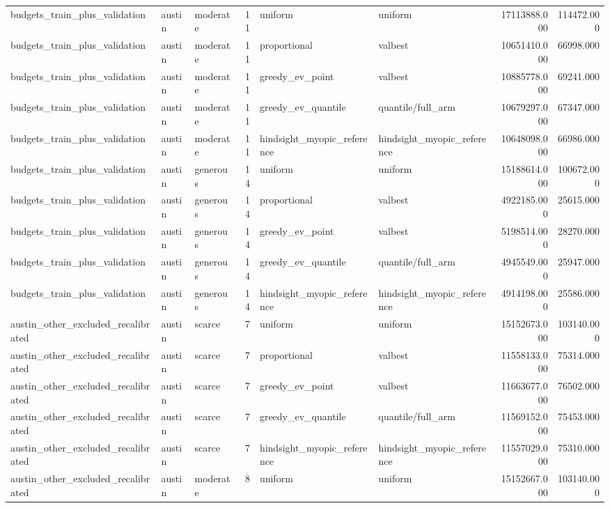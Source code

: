 \begin{tabular}{lllrllrr}
budgets\_train\_plus\_validation & austin & moderate & 11 & uniform & uniform & 17113888.000 & 114472.000 \\
budgets\_train\_plus\_validation & austin & moderate & 11 & proportional & valbest & 10651410.000 & 66998.000 \\
budgets\_train\_plus\_validation & austin & moderate & 11 & greedy\_ev\_point & valbest & 10885778.000 & 69241.000 \\
budgets\_train\_plus\_validation & austin & moderate & 11 & greedy\_ev\_quantile & quantile/full\_arm & 10679297.000 & 67347.000 \\
budgets\_train\_plus\_validation & austin & moderate & 11 & hindsight\_myopic\_reference & hindsight\_myopic\_reference & 10648098.000 & 66986.000 \\
budgets\_train\_plus\_validation & austin & generous & 14 & uniform & uniform & 15188614.000 & 100672.000 \\
budgets\_train\_plus\_validation & austin & generous & 14 & proportional & valbest & 4922185.000 & 25615.000 \\
budgets\_train\_plus\_validation & austin & generous & 14 & greedy\_ev\_point & valbest & 5198514.000 & 28270.000 \\
budgets\_train\_plus\_validation & austin & generous & 14 & greedy\_ev\_quantile & quantile/full\_arm & 4945549.000 & 25947.000 \\
budgets\_train\_plus\_validation & austin & generous & 14 & hindsight\_myopic\_reference & hindsight\_myopic\_reference & 4914198.000 & 25586.000 \\
austin\_other\_excluded\_recalibrated & austin & scarce & 7 & uniform & uniform & 15152673.000 & 103140.000 \\
austin\_other\_excluded\_recalibrated & austin & scarce & 7 & proportional & valbest & 11558133.000 & 75314.000 \\
austin\_other\_excluded\_recalibrated & austin & scarce & 7 & greedy\_ev\_point & valbest & 11663677.000 & 76502.000 \\
austin\_other\_excluded\_recalibrated & austin & scarce & 7 & greedy\_ev\_quantile & quantile/full\_arm & 11569152.000 & 75453.000 \\
austin\_other\_excluded\_recalibrated & austin & scarce & 7 & hindsight\_myopic\_reference & hindsight\_myopic\_reference & 11557029.000 & 75310.000 \\
austin\_other\_excluded\_recalibrated & austin & moderate & 8 & uniform & uniform & 15152667.000 & 103140.000 \\

\end{tabular}
